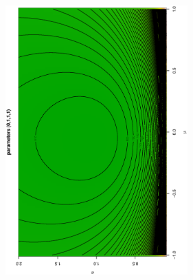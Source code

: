 \begin{slide}
\end{slide}\begin{slide}
\centerline{\includegraphics[height=\textwidth,width=7cm,angle=270]{figures/bidimposterior.ps}}

\end{slide}
